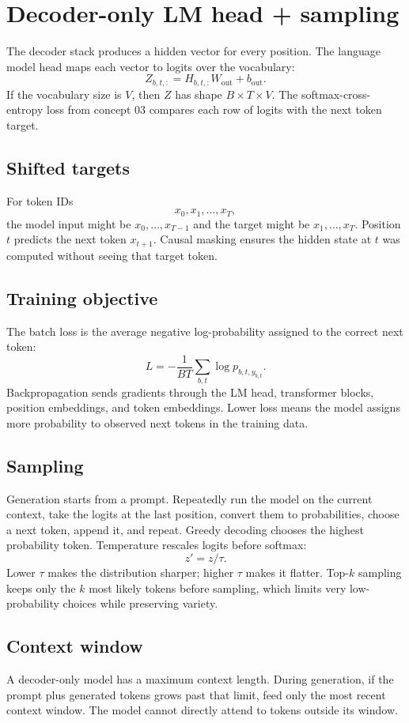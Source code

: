 \section{Decoder-only LM head + sampling}\label{sec:13}

The decoder stack produces a hidden vector for every position. The language
model head maps each vector to logits over the vocabulary:
\[
  Z_{b,t,:} = H_{b,t,:}W_{\text{out}} + b_{\text{out}}.
\]
If the vocabulary size is $V$, then $Z$ has shape $B \times T \times V$. The
softmax-cross-entropy loss from concept 03 compares each row of logits with the
next token target.

\subsection*{Shifted targets}
For token IDs
\[
  x_0, x_1, \dots, x_T,
\]
the model input might be $x_0,\dots,x_{T-1}$ and the target might be
$x_1,\dots,x_T$. Position $t$ predicts the next token $x_{t+1}$. Causal masking
ensures the hidden state at $t$ was computed without seeing that target token.

\subsection*{Training objective}
The batch loss is the average negative log-probability assigned to the correct
next token:
\[
  L = -\frac{1}{BT}\sum_{b,t}\log p_{b,t,y_{b,t}}.
\]
Backpropagation sends gradients through the LM head, transformer blocks,
position embeddings, and token embeddings. Lower loss means the model assigns
more probability to observed next tokens in the training data.

\subsection*{Sampling}
Generation starts from a prompt. Repeatedly run the model on the current
context, take the logits at the last position, convert them to probabilities,
choose a next token, append it, and repeat. Greedy decoding chooses the highest
probability token. Temperature rescales logits before softmax:
\[
  z' = z / \tau.
\]
Lower $\tau$ makes the distribution sharper; higher $\tau$ makes it flatter.
Top-$k$ sampling keeps only the $k$ most likely tokens before sampling, which
limits very low-probability choices while preserving variety.

\subsection*{Context window}
A decoder-only model has a maximum context length. During generation, if the
prompt plus generated tokens grows past that limit, feed only the most recent
context window. The model cannot directly attend to tokens outside its window.

